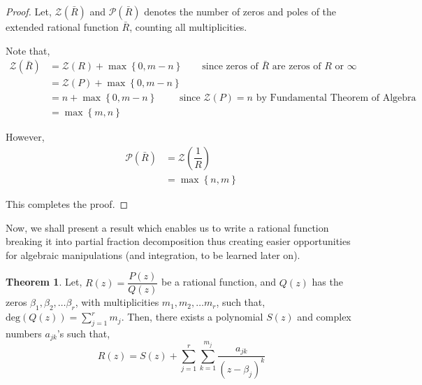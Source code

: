 \documentclass[12pt]{article}
\theoremstyle{definition}
\newtheorem{thm}{Theorem}
\newenvironment{theorem}{
\begin{tcolorbox}[colback=green!5!white,colframe=green!75!black, parbox = false]\begin{thm} }{\end{thm}\end{tcolorbox} }
\begin{document}
\begin{proof}
    Let, $\mathcal{Z}(\bar{R})$ and $\mathcal{P}(\bar{R})$ denotes the number of zeros and poles of the extended rational function $\bar{R}$, counting all multiplicities.
    
    Note that,
    \begin{align*}
        \mathcal{Z}(\bar{R}) & = \mathcal{Z}(R) + \max\left\{0, m-n\right\} \qquad \text{since zeros of } \bar{R} \text{ are zeros of } R \text{ or } \infty\\
        & = \mathcal{Z}(P) + \max\left\{0, m-n\right\}\\
        & = n + \max\left\{0, m-n\right\} \qquad \text{ since } \mathcal{Z}(P) = n \text{ by Fundamental Theorem of Algebra} \\
        & = \max\left\{ m, n \right\}
    \end{align*}
    
    However,
    \begin{align*}
        \mathcal{P}(\bar{R}) & = \mathcal{Z}\left( \dfrac{1}{R} \right)\\
        & = \max\left\{ n, m \right\}
    \end{align*}
    
    This completes the proof.
\end{proof}

Now, we shall present a result which enables us to write a rational function breaking it into partial fraction decomposition thus creating easier opportunities for algebraic manipulations (and integration, to be learned later on).

\begin{theorem}
    Let, $R(z) = \dfrac{P(z)}{Q(z)}$ be a rational function, and $Q(z)$ has the zeros $\beta_1, \beta_2, \dots \beta_r$, with multiplicities $m_1, m_2, \dots m_r$, such that, $\text{deg}(Q(z)) = \sum_{j=1}^{r} m_j$.
    Then, there exists a polynomial $S(z)$ and complex numbers $a_{jk}$'s such that, $$R(z) = S(z) + \sum_{j=1}^{r} \sum_{k = 1}^{m_j} \dfrac{a_{jk}}{(z - \beta_j)^{k}}$$
\end{theorem}
\end{document}

